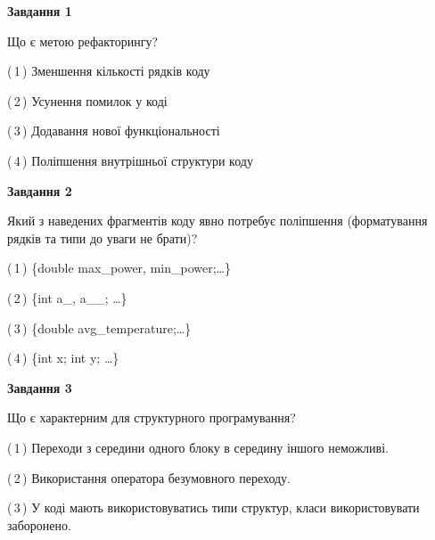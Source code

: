\documentclass[10pt, ukrainian]{article}
\begin{document}
{
\begin {large}
{\begin {center}\textbf{Завдання 1}\end {center}}\par
Що є метою рефакторингу?\par
\vspace{2mm}



(\,1\,) Зменшення кількості рядків коду%



(\,2\,) Усунення помилок у коді%



(\,3\,) Додавання нової функціональності%



(\,4\,) Поліпшення внутрішньої структури коду%


{\begin {center}\textbf{Завдання 2}\end {center}}\par
Який з наведених фрагментів коду явно потребує поліпшення (форматування рядків та типи до уваги не брати)?\par
\vspace{2mm}



(\,1\,) \{double max\_power, min\_power;…\} %



(\,2\,) \{int a\_, a\_\_; …\}%



(\,3\,) \{double avg\_temperature;…\} %



(\,4\,) \{int x; int y; …\}%


{\begin {center}\textbf{Завдання 3}\end {center}}\par
Що є характерним для структурного програмування?\par
\vspace{2mm}



(\,1\,) Переходи з середини одного блоку в середину іншого неможливі. %



(\,2\,) Використання оператора безумовного переходу. %



(\,3\,) У коді мають використовуватись типи структур, класи використовувати заборонено. %




\end{large}}
\end{document}
